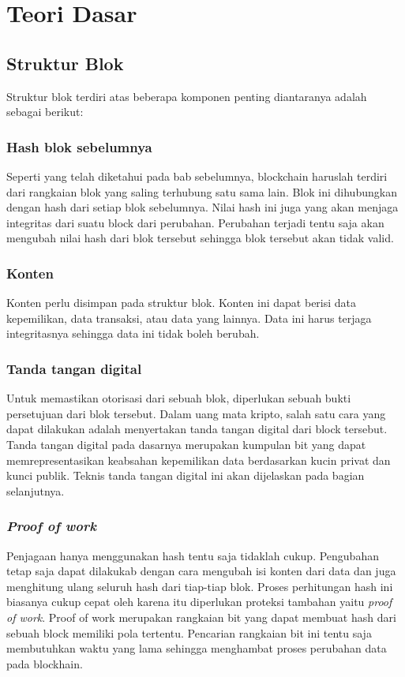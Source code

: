 \documentclass[10pt,conference]{IEEEtran}
\theoremstyle{definition}
\begin{document}
\section{Teori Dasar}
\subsection{Struktur Blok}
Struktur blok terdiri atas beberapa komponen penting diantaranya adalah sebagai berikut:


    \subsubsection{Hash blok sebelumnya}
    Seperti yang telah diketahui pada bab sebelumnya, blockchain haruslah terdiri dari rangkaian blok yang saling terhubung satu sama lain. Blok ini dihubungkan dengan hash dari setiap blok sebelumnya. Nilai hash ini juga yang akan menjaga integritas dari suatu block dari perubahan. Perubahan terjadi tentu saja akan mengubah nilai hash dari blok tersebut sehingga blok tersebut akan tidak valid.

    \subsubsection{Konten}
    Konten perlu disimpan pada struktur blok. Konten ini dapat berisi data kepemilikan, data transaksi, atau data yang lainnya. Data ini harus terjaga integritasnya sehingga data ini tidak boleh berubah. 

    \subsubsection{Tanda tangan digital} 
    Untuk memastikan otorisasi dari sebuah blok, diperlukan sebuah bukti persetujuan dari blok tersebut. Dalam uang mata kripto, salah satu cara yang dapat dilakukan adalah menyertakan tanda tangan digital dari block tersebut. Tanda tangan digital pada dasarnya merupakan kumpulan bit yang dapat memrepresentasikan keabsahan kepemilikan data berdasarkan kucin privat dan kunci publik. Teknis tanda tangan digital ini akan dijelaskan pada bagian selanjutnya.

    \subsubsection{\emph{Proof of work}} 
    Penjagaan hanya menggunakan hash tentu saja tidaklah cukup. Pengubahan tetap saja dapat  dilakukab dengan cara mengubah isi konten dari data dan juga menghitung ulang seluruh hash dari tiap-tiap blok. Proses perhitungan hash ini biasanya cukup cepat oleh karena itu diperlukan proteksi tambahan yaitu \emph{proof of work}. Proof of work merupakan rangkaian bit yang dapat membuat hash dari sebuah block memiliki pola tertentu. Pencarian rangkaian bit ini tentu saja membutuhkan waktu yang lama sehingga menghambat proses perubahan data pada blockhain.
\end{document}
